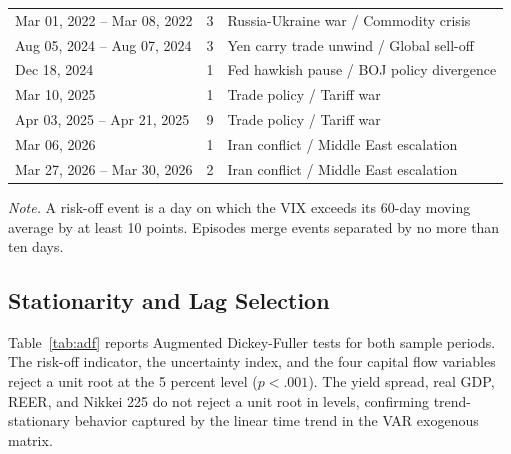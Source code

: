 \begin{table}[H]
\begin{tabular}{l r l}
Mar 01, 2022 -- Mar 08, 2022 & 3 & Russia-Ukraine war / Commodity crisis \\
Aug 05, 2024 -- Aug 07, 2024 & 3 & Yen carry trade unwind / Global sell-off \\
Dec 18, 2024 & 1 & Fed hawkish pause / BOJ policy divergence \\
Mar 10, 2025 & 1 & Trade policy / Tariff war \\
Apr 03, 2025 -- Apr 21, 2025 & 9 & Trade policy / Tariff war \\
Mar 06, 2026 & 1 & Iran conflict / Middle East escalation \\
Mar 27, 2026 -- Mar 30, 2026 & 2 & Iran conflict / Middle East escalation \\
    \bottomrule
  \end{tabular}
\end{table}
\FloatBarrier

\begin{center}
  \small\textit{Note.} A risk-off event is a day on which the VIX exceeds its 60-day moving average by at least 10 points. Episodes merge events separated by no more than ten days.
\end{center}

\FloatBarrier

\subsection{Stationarity and Lag Selection}

Table~\ref{tab:adf} reports Augmented Dickey-Fuller tests for both sample periods. The risk-off indicator, the uncertainty index, and the four capital flow variables reject a unit root at the 5 percent level ($p < .001$). The yield spread, real GDP, REER, and Nikkei 225 do not reject a unit root in levels, confirming trend-stationary behavior captured by the linear time trend in the VAR exogenous matrix.

